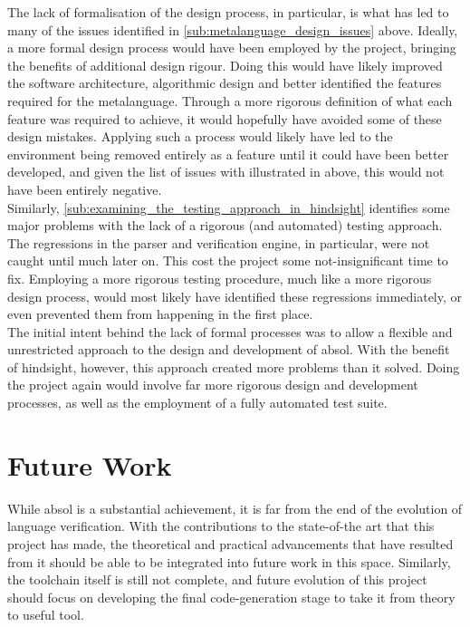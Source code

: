 The lack of formalisation of the design process, in particular, is what has led to many of the issues identified in \autoref{sub:metalanguage_design_issues} above.
Ideally, a more formal design process would have been employed by the project, bringing the benefits of additional design rigour.
Doing this would have likely improved the software architecture, algorithmic design and better identified the features required for the metalanguage. 
Through a more rigorous definition of what each feature was required to achieve, it would hopefully have avoided some of these design mistakes. 
Applying such a process would likely have led to the environment being removed entirely as a feature until it could have been better developed, and given the list of issues with illustrated in  above, this would not have been entirely negative. \\

Similarly, \autoref{sub:examining_the_testing_approach_in_hindsight} identifies some major problems with the lack of a rigorous (and automated) testing approach.
The regressions in the parser and verification engine, in particular, were not caught until much later on.
This cost the project some not-insignificant time to fix. 
Employing a more rigorous testing procedure, much like a more rigorous design process, would most likely have identified these regressions immediately, or even prevented them from happening in the first place.\\

The initial intent behind the lack of formal processes was to allow a flexible and unrestricted approach to the design and development of \gls{absol}.
With the benefit of hindsight, however, this approach created more problems than it solved.
Doing the project again would involve far more rigorous design and development processes, as well as the employment of a fully automated test suite.



\section{Future Work} %
\label{sec:future_work}

While \gls{absol} is a substantial achievement, it is far from the end of the evolution of language verification. 
With the contributions to the state-of-the art that this project has made, the theoretical and practical advancements that have resulted from it should be able to be integrated into future work in this space. 
Similarly, the toolchain itself is still not complete, and future evolution of this project should focus on developing the final code-generation stage to take it from theory to useful tool.

